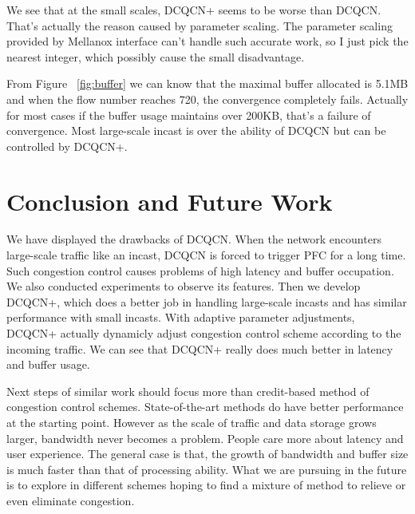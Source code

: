 \documentclass[12pt,a4paper]{article}
\begin{document}
We see that at the small scales, DCQCN+ seems to be worse than DCQCN.
That's actually the reason caused by parameter scaling.
The parameter scaling provided by Mellanox interface can't handle such accurate work, so I just pick the nearest integer,
which possibly cause the small disadvantage.

From Figure ~\ref{fig:buffer} we can know that the maximal buffer allocated is 5.1MB and when the flow number reaches 720,
the convergence completely fails.
Actually for most cases if the buffer usage maintains over 200KB, that's a failure of convergence.
Most large-scale incast is over the ability of DCQCN but can be controlled by DCQCN+.

\section{Conclusion and Future Work}

We have displayed the drawbacks of DCQCN.
When the network encounters large-scale traffic like an incast, DCQCN is forced to trigger PFC for a long time.
Such congestion control causes problems of high latency and buffer occupation.
We also conducted experiments to observe its features.
Then we develop DCQCN+, which does a better job in handling large-scale incasts and has similar performance with small incasts.
With adaptive parameter adjustments, DCQCN+ actually dynamicly adjust congestion control scheme according to the incoming traffic.
We can see that DCQCN+ really does much better in latency and buffer usage.

Next steps of similar work should focus more than credit-based method of congestion control schemes.
State-of-the-art methods do have better performance at the starting point.
However as the scale of traffic and data storage grows larger, bandwidth never becomes a problem.
People care more about latency and user experience.
The general case is that, the growth of bandwidth and buffer size is much faster than that of processing ability.
What we are pursuing in the future is to explore in different schemes hoping to find a mixture of method to relieve or even eliminate congestion.






\end{document}
